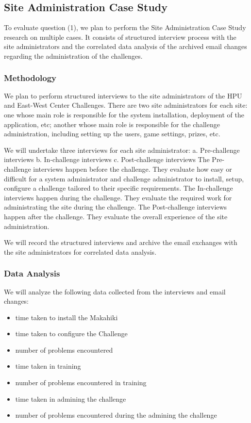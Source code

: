 \documentclass[11pt]{article}
\begin{document}
\subsection{Site Administration Case Study}
To evaluate question (1), we plan to perform the Site Administration Case Study research on multiple cases. It consists of structured interview process with the site administrators and the correlated data analysis of the archived email changes regarding the administration of the challenges.

\subsubsection{Methodology}

We plan to perform structured interviews to the site administrators of the HPU and East-West Center Challenges. There are two site administrators for each site: one whose main role is responsible for the system installation, deployment of the application, etc; another whose main role is responsible for the challenge administration, including setting up the users, game settings, prizes, etc.

We will undertake three interviews for each site administrator:
a. Pre-challenge interviews
b. In-challenge interviews
c. Post-challenge interviews
The Pre-challenge interviews happen before the challenge. They evaluate how easy or difficult for a system administrator and challenge administrator to install, setup, configure a challenge tailored to their specific requirements. The In-challenge interviews happen during the challenge. They evaluate the required work for administrating the site during the challenge. The Post-challenge interviews happen after the challenge. They evaluate the overall experience of the site administration.

We will record the structured interviews and archive the email exchanges with the site administrators for correlated data analysis.

\subsubsection{Data Analysis}
We will analyze the following data collected from the interviews and email changes:
\begin{itemize}
 \item time taken to install the Makahiki
 \item time taken to configure the Challenge
 \item number of problems encountered
 \item time taken in training
 \item number of problems encountered in training
 \item time taken in admining the challenge
 \item number of problems encountered during the admining the challenge
\end{itemize}
\end{document}
